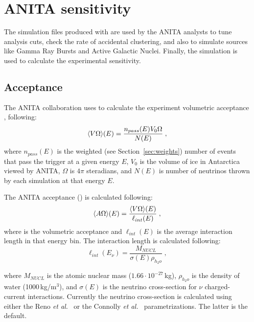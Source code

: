 \section{ANITA sensitivity}
\label{sec:results}

The simulation files produced with \icemc are used by the ANITA analysts to tune analysis cuts, check the rate of accidental clustering, and also to simulate sources like Gamma Ray Bursts and Active Galactic Nuclei.
Finally, the simulation is used to calculate the experimental sensitivity.

\subsection{Acceptance}
\label{subsec:acceptance}
The ANITA collaboration uses \icemc to calculate the experiment volumetric acceptance \effvol, following:
\begin{equation}
  \label{eq:volacceptance}
  \langle V\Omega\rangle(E) = \dfrac{n_{{pass}}(E)V_0\Omega}{N(E)} \;,
\end{equation}
\noindent where
 $n_{{pass}}(E)$ is the weighted (see Section~\ref{sec:weights}) number of events that pass the trigger at a given energy $E$,
 $V_0$ is the volume of ice in Antarctica viewed by ANITA,
$\Omega$ is $4\pi$ steradians, and 
 $N(E)$ is number of neutrinos thrown by each simulation at that energy $E$.

The ANITA acceptance (\effarea) is calculated following:
\begin{equation}
  \label{eq:acceptance}
  \langle A\Omega\rangle(E) = \dfrac{\langle V\Omega\rangle(E)}{\ell_{{int}}(E)} \;,
\end{equation}
\noindent where
 \effvol is the volumetric acceptance and
 $\ell_{{int}}(E)$ is the average interaction length in that energy bin. %
The interaction length is calculated following:
 \begin{equation}
   \label{eq:intlength}
    \ell_{{int}}(E_\nu) =   \dfrac{M_{NUCL}}{\sigma(E) \rho_{h_2o} } \;,
  \end{equation}
  
\noindent where
 $M_{NUCL}$ is the atomic nuclear mass ($1.66\cdot 10^{-27}$\,kg),
 $\rho_{h_2o}$ is the density of water (1000\,kg/m$^3$), 
and $\sigma(E)$ is the neutrino cross-section for $\nu$ charged-current interactions.
Currently the neutrino cross-section is calculated using either the
Reno {\it et al.}~\cite{reno2005high}
or the Connolly {\it et al.}~\cite{PhysRevD.83.113009} parametrizations.
The latter is the default.

